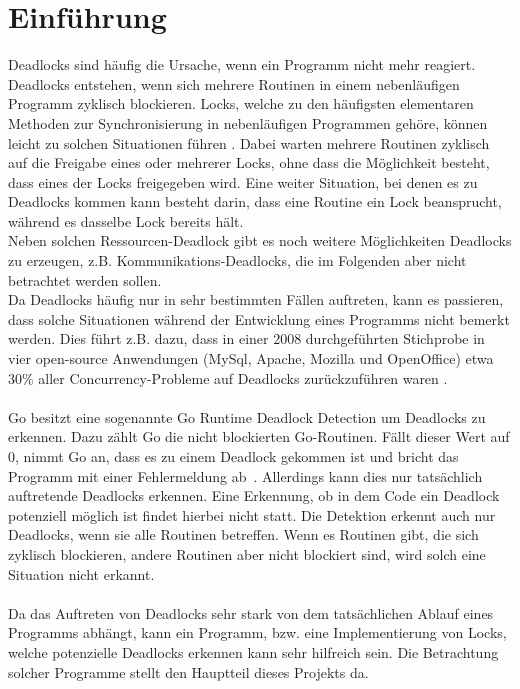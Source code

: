 \chapter{Einführung}
Deadlocks sind häufig die Ursache, wenn ein Programm nicht mehr reagiert\cite{Joshi}.
Deadlocks entstehen, wenn sich mehrere Routinen in einem nebenläufigen 
Programm zyklisch blockieren. Locks, welche zu den häufigsten elementaren 
Methoden zur Synchronisierung in nebenläufigen Programmen gehöre, können 
leicht zu solchen Situationen führen \cite{zhou}. Dabei warten mehrere Routinen 
zyklisch auf die Freigabe eines oder mehrerer Locks, ohne dass die Möglichkeit
besteht, dass eines der Locks freigegeben wird. Eine weiter Situation, 
bei denen es zu Deadlocks kommen kann besteht darin, dass eine Routine 
ein Lock beansprucht, während es dasselbe Lock bereits hält.\\ 
Neben solchen Ressourcen-Deadlock gibt es noch weitere Möglichkeiten Deadlocks 
zu erzeugen, z.B. Kommunikations-Deadlocks, die im Folgenden aber nicht betrachtet 
werden sollen. \\
Da Deadlocks häufig nur in sehr bestimmten Fällen auftreten, kann es passieren,
dass solche Situationen während der Entwicklung eines Programms nicht bemerkt
werden. Dies führt z.B. dazu, dass in einer 2008 durchgeführten Stichprobe in 
vier open-source Anwendungen 
(MySql, Apache, Mozilla und OpenOffice) etwa $30 \%$ aller Concurrency-Probleme 
auf Deadlocks zurückzuführen waren \cite{Lu}.\\\\
Go besitzt eine sogenannte Go Runtime Deadlock Detection um Deadlocks zu erkennen. 
Dazu zählt Go die nicht blockierten Go-Routinen.
Fällt dieser Wert auf $0$, nimmt Go an, dass es zu einem Deadlock gekommen 
ist und bricht das Programm mit einer Fehlermeldung ab~\cite{grdd_code}.
Allerdings kann 
dies nur tatsächlich auftretende Deadlocks erkennen. Eine Erkennung, ob 
in dem Code ein Deadlock potenziell möglich ist findet hierbei nicht statt. Die 
Detektion erkennt auch nur Deadlocks, wenn sie alle Routinen betreffen. 
Wenn es Routinen gibt, die sich zyklisch blockieren, andere Routinen aber 
nicht blockiert sind, wird solch eine Situation nicht erkannt.\\\\
Da das Auftreten von Deadlocks sehr stark von dem tatsächlichen Ablauf eines 
Programms abhängt, kann ein Programm, bzw. eine Implementierung 
von Locks, welche potenzielle Deadlocks erkennen kann sehr hilfreich sein.
Die Betrachtung solcher Programme stellt den Hauptteil dieses Projekts da.
